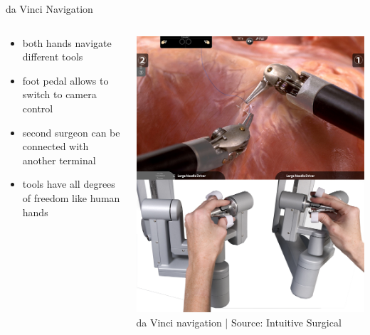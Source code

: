\begin{frame}{da Vinci Navigation}
	\begin{columns}[T]
		\begin{column}{0.55\textwidth}
			\vspace{2em}
			\centering
			\begin{itemize}
				\item both hands navigate different tools
				\item foot pedal allows to switch to camera control
				\item second surgeon can be connected with another terminal
				\item tools have all degrees of freedom like human hands
			\end{itemize}
		\end{column}
		\begin{column}{0.45\textwidth}
			\centering
			\includegraphics[height=.75\textheight ]{images/davinci1}\\
			\scriptsize da Vinci navigation | Source: Intuitive Surgical
		\end{column}
	\end{columns}


\end{frame}



